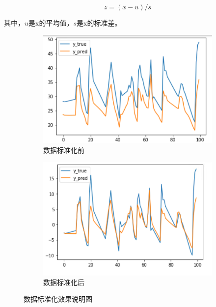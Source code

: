   \begin{equation}\label{eq:normalizaiton}
    z=(x-u)/s
  \end{equation}

  其中，$u$是x的平均值，$s$是x的标准差。

  \begin{figure}
    \centering
    
    \begin{subfigure}[b]{0.45\textwidth}
        \centering
        \includegraphics[width=\textwidth]{figures/normalization1.png}
        \caption{数据标准化前}
        \label{fig:before normalization}
    \end{subfigure}
    \hfill
    \begin{subfigure}[b]{0.45\textwidth}
      \centering
      \includegraphics[width=\textwidth]{figures/normalization2.png}
      \caption{数据标准化后}
      \label{fig:after normalization}
    \end{subfigure}
    
    \caption{数据标准化效果说明图}
    \label{fig:normalization}
  \end{figure}

